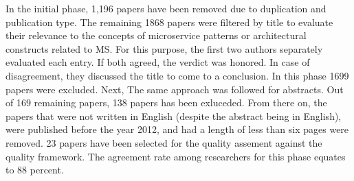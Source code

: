 \documentclass[a4paper,11pt,article,oneside]{memoir}
\begin{document}
\begin{description}
    
    In the initial phase, 1,196 papers have been removed due to duplication and publication type. The remaining 1868 papers were filtered by title to evaluate their relevance to the concepts of microservice patterns or architectural constructs related to MS. For this purpose, the first two authors separately evaluated each entry. If both agreed, the verdict was honored. In case of disagreement, they discussed the title to come to a conclusion. In this phase 1699 papers were excluded. Next, The same approach was followed for abstracts. Out of 169 remaining papers, 138 papers has been exluceded. From there on, the papers that were not written in English (despite the abstract being in English), were published before the year 2012, and had a length of less than six pages were removed. 23 papers have been selected for the quality assement against the quality framework. The agreement rate among researchers for this phase equates to 88 percent. 
    
    
    
    
    
    
    
    

\end{description}
\end{document}
